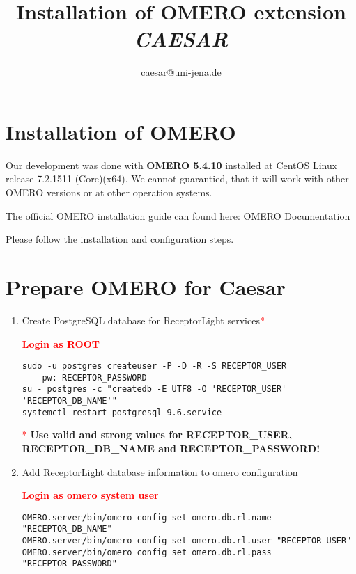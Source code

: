 \documentclass[a4paper,12pt,english]{article}
\begin{document}
\title{Installation of OMERO extension \textbf{\textit{CAESAR}} }

\author{caesar@uni-jena.de}

\maketitle

\section{Installation of OMERO}

Our development was done with \textbf{OMERO 5.4.10} installed at CentOS Linux release 7.2.1511 (Core)(x64). We cannot guarantied, that it will work with other OMERO versions or at other operation systems.

The official OMERO installation guide can found here: 
\href{https://docs.openmicroscopy.org/omero/5.4.10/sysadmins/unix/server-centos7-ice36.html}{OMERO Documentation}

Please follow the installation and configuration steps.

\section{Prepare OMERO for Caesar}

\begin{enumerate}

\item Create PostgreSQL database for ReceptorLight services\textcolor{red}{*}

\textcolor{red}{\textbf{Login as ROOT}}

\begin{lstlisting}
sudo -u postgres createuser -P -D -R -S RECEPTOR_USER
    pw: RECEPTOR_PASSWORD
su - postgres -c "createdb -E UTF8 -O 'RECEPTOR_USER' 'RECEPTOR_DB_NAME'"
systemctl restart postgresql-9.6.service
\end{lstlisting}

\textcolor{red}{*} {\textbf{Use valid and strong values for RECEPTOR\_USER, RECEPTOR\_DB\_NAME and RECEPTOR\_PASSWORD!}}

\item Add ReceptorLight database information to omero configuration

\textcolor{red}{\textbf{Login as omero system user}}

\begin{lstlisting}
OMERO.server/bin/omero config set omero.db.rl.name "RECEPTOR_DB_NAME" 
OMERO.server/bin/omero config set omero.db.rl.user "RECEPTOR_USER" 
OMERO.server/bin/omero config set omero.db.rl.pass "RECEPTOR_PASSWORD"
\end{lstlisting}

\end{enumerate}
\end{document}
